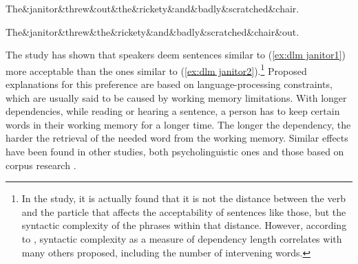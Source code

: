 \begin{exe}
    \ex\label{ex:dlm janitor}
    \begin{xlist}
    \ex\label{ex:dlm janitor1}
    \begin{dependency}[theme = simple, segmented edge, baseline=-\the\dimexpr\fontdimen22\textfont2\relax]
        \begin{deptext}
        The\&janitor\&threw\&out\&the\&rickety\&and\&badly\&scratched\&chair.\\
        \end{deptext}
    \end{dependency}

    \ex\label{ex:dlm janitor2}
    \begin{dependency}[theme = simple, segmented edge, edge height = 4ex, baseline=-\the\dimexpr\fontdimen22\textfont2\relax]
        \begin{deptext}
        The\&janitor\&threw\&the\&rickety\&and\&badly\&scratched\&chair\&out.\\
        \end{deptext}
    \end{dependency}
    \end{xlist}
\end{exe}

The study has shown that speakers deem sentences similar to (\ref{ex:dlm janitor1}) more acceptable than the ones similar to (\ref{ex:dlm janitor2}).\footnote{In the study, it is actually found that it is not the distance between the verb and the particle that affects the acceptability of sentences like those, but the syntactic complexity of the phrases within that distance. However, according to \cite{wasow2002postverbal}, syntactic complexity as a measure of dependency length correlates with many others proposed, including the number of intervening words.} Proposed explanations for this preference are based on language-processing constraints, which are usually said to be caused by working memory limitations. With longer dependencies, while reading or hearing a sentence, a person has to keep certain words in their working memory for a longer time. The longer the dependency, the harder the retrieval of the needed word from the working memory. Similar effects have been found in other studies, both psycholinguistic ones \citep{KING1991580, GIBSON19981} and those based on corpus research \citep{gildea-temperley-2007-optimizing, gildea-temperley-2010, futrell2020, dyer-2023}. 

